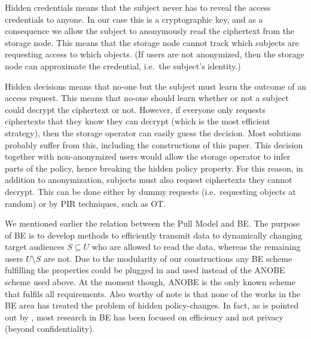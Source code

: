 Hidden credentials means that the subject never has to reveal the access 
credentials to anyone.
In our case this is a cryptographic key, and as a consequence we allow the 
subject to anonymously read the ciphertext from the storage node.
This means that the storage node cannot track which subjects are requesting 
access to which objects.
(If users are not anonymized, then the storage node can approximate the 
credential, i.e.\ the subject's identity.)

Hidden decisions means that no-one but the subject must learn the outcome of an 
access request.
This means that no-one should learn whether or not a subject could decrypt the 
ciphertext or not.
However, if everyone only requests ciphertexts that they know they can decrypt 
(which is the most efficient strategy), then the storage operator can easily 
guess the decision.
Most solutions probably suffer from this, including the constructions of this 
paper.
This decision together with non-anonymized users would allow the storage 
operator to infer parts of the policy, hence breaking the hidden policy 
property.
For this reason, in addition to anonymization, subjects must also request 
ciphertexts they cannot decrypt.
This can be done either by dummy requests (i.e.\ requesting objects at random) 
or by \ac{PIR} techniques, such as \ac{OT}.

We mentioned earlier the relation between the Pull Model and \ac{BE}.
The purpose of \ac{BE} is to develop methods to efficiently transmit data to 
dynamically changing target audiences \(S\subseteq U\) who are allowed to read 
the data, whereas the remaining users \(U\setminus S\) are not.
Due to the modularity of our constructions any \ac{BE} scheme fulfilling the 
properties could be plugged in and used instead of the \ac{ANOBE} scheme used 
above.
At the moment though, \ac{ANOBE} is the only known scheme that fulfils all 
requirements.
Also worthy of note is that none of the works in the \ac{BE} area has treated 
the problem of hidden policy-changes.
In fact, as is pointed out by \citet{ANOBE}, most research in \ac{BE} has been 
focused on efficiency and not privacy (beyond confidentiality).

